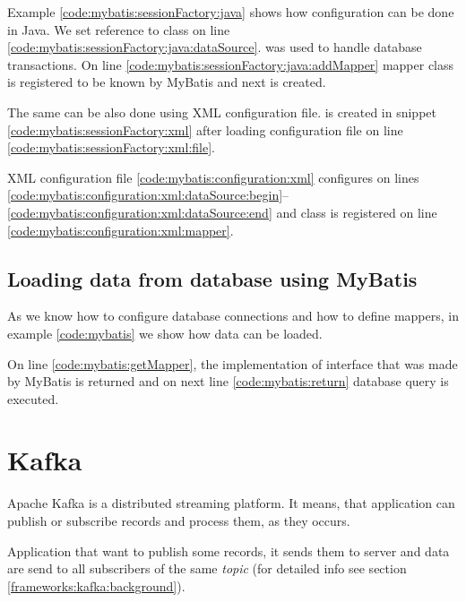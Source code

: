 Example \ref{code:mybatis:sessionFactory:java} shows how configuration can be done in Java.
We set  reference to  class on line \ref{code:mybatis:sessionFactory:java:dataSource}.
 was used to handle database transactions.
On line \ref{code:mybatis:sessionFactory:java:addMapper} mapper class is registered to be known by MyBatis
and next  is created.


The same can be also done using XML configuration file.
 is created in snippet \ref{code:mybatis:sessionFactory:xml}
after loading configuration file on line \ref{code:mybatis:sessionFactory:xml:file}.

XML configuration file \ref{code:mybatis:configuration:xml} configures  on lines
\ref{code:mybatis:configuration:xml:dataSource:begin}--\ref{code:mybatis:configuration:xml:dataSource:end}
and  class is registered on line \ref{code:mybatis:configuration:xml:mapper}.



\subsection{Loading data from database using MyBatis \label{mybatis:run}}

As we know how to configure database connections and how to define mappers,
in example \ref{code:mybatis} we show how data can be loaded.

On line \ref{code:mybatis:getMapper}, the implementation of  interface
that was made by MyBatis is returned and on next line \ref{code:mybatis:return} database query is executed.




\section{Kafka \label{frameworks:kafka}}

Apache Kafka \citet{Kafka} is a distributed streaming platform.
It means, that application can publish or subscribe records and
process them, as they occurs.

Application that want to publish some records, it sends them to server
and data are send to all subscribers of the same \textit{topic}
(for detailed info see section \ref{frameworks:kafka:background}).

